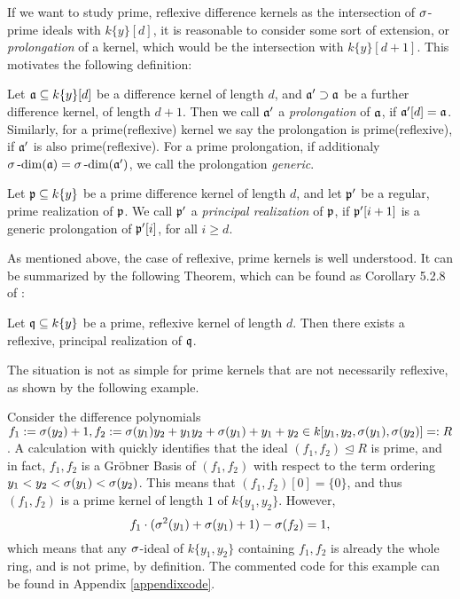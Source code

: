 If we want to study prime, reflexive difference kernels as the intersection of $\sigma$-prime ideals with $k\{y\}[d]$,
it is reasonable to consider some sort of extension, or \emph{prolongation} of a kernel, which would be the intersection with $k\{y\}[d+1]$.  
This motivates the following definition: 

\begin{defn}
Let $\mathfrak{a} \subseteq k\{y\}[d]$ be a difference kernel of length $d$, and $\mathfrak{a}' \supset \mathfrak{a}$ be a further difference kernel, of length $d+1$.
Then we call $\mathfrak{a}'$ a \emph{prolongation} of $\mathfrak{a}$, if $\mathfrak{a}'[d] = \mathfrak{a}$. Similarly, for a prime(reflexive) kernel we say the prolongation is prime(reflexive), if $\mathfrak{a}'$ is also prime(reflexive).
For a prime prolongation, if additionaly $\sigma\operatorname{-dim}(\mathfrak{a}) = \sigma\operatorname{-dim}(\mathfrak{a}')$, we call the prolongation \emph{generic}.
\end{defn}

\begin{defn}
Let $\mathfrak{p} \subseteq k\{y\}$ be a prime difference kernel of length $d$, and let $\mathfrak{p}'$ be a regular, prime realization of $\mathfrak{p}$. We call $\mathfrak{p}'$ a \emph{principal realization} of $\mathfrak{p}$, if $\mathfrak{p}'[i+1]$ is a generic prolongation of $\mathfrak{p}'[i]$, for all $i \geq d$. 
\end{defn}

As mentioned above, the case of reflexive, prime kernels is well understood. It can be summarized by the following Theorem, which can be found as Corollary 5.2.8 of \cite{wibmer}:
\begin{theorem}\label{reflexiverealization}
Let $\mathfrak{q} \subseteq k\{y\}$ be a prime, reflexive kernel of length $d$. Then there exists a reflexive, principal realization of $\mathfrak{q}$. 
\end{theorem}

The situation is not as simple for prime kernels that are not necessarily reflexive, as shown by the following example.

\begin{ex}\label{counterexker}
Consider the difference polynomials $f_1 := \sigma(y_2) + 1, f_2:= \sigma(y_1)y_2 + y_1y_2 + \sigma(y_1) + y_1 + y_2 \in k[y_1,y_2,\sigma(y_1),\sigma(y_2)] =: R$.
A calculation with \cite{M2} quickly identifies that the ideal $(f_1,f_2) \unlhd R$ is prime, and in fact, $f_1,f_2$ is a Gr\"{o}bner Basis of $(f_1,f_2)$ with respect to the
term ordering $y_1 < y_2 < \sigma(y_1) < \sigma(y_2)$. This means that $(f_1,f_2)[0] = \{0\}$, and thus $(f_1,f_2)$ is a prime kernel of length $1$ of $k\{y_1,y_2\}$. However,
\[ f_1 \cdot (\sigma^2(y_1) + \sigma(y_1) + 1 ) - \sigma(f_2) = 1, \]
which means that any $\sigma$-ideal of $k\{y_1,y_2\}$ containing $f_1, f_2$ is already the whole ring, and is not prime, by definition.
The commented code for this example can be found in Appendix \ref{appendixcode}.
\end{ex}

